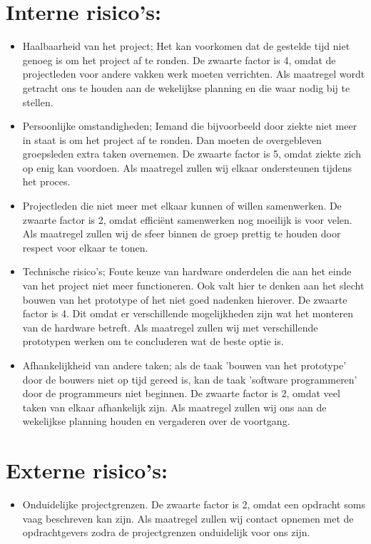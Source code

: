 \documentclass[oneside]{book}
\begin{document}
\section*{Interne risico's:}
{\color{red}
\begin{itemize}
	\item Haalbaarheid van het project; Het kan voorkomen dat de gestelde
   tijd niet genoeg is om het project af te ronden. De zwaarte factor is 4, omdat de 
   projectleden voor andere vakken werk moeten verrichten. Als maatregel wordt getracht ons  
   te houden aan de wekelijkse planning en die waar nodig bij te stellen.

	\item Persoonlijke omstandigheden; Iemand die bijvoorbeeld door ziekte niet meer in staat is om   
   het project af te ronden. Dan moeten de overgebleven groepsleden extra taken overnemen. 
   De zwaarte factor is 5,  omdat ziekte zich op enig kan voordoen. Als maatregel zullen wij 
   elkaar ondersteunen tijdens het proces. 

	\item Projectleden die niet meer met elkaar kunnen of willen samenwerken. De zwaarte factor is 2, 
   omdat efficiënt samenwerken nog moeilijk is voor velen. Als maatregel  
    zullen wij de sfeer binnen de groep prettig te houden door respect voor elkaar te tonen.

	\item Technische risico's; Foute keuze van hardware onderdelen die 
   aan het einde van het project niet meer functioneren. Ook valt hier te denken aan het slecht  
   bouwen van het prototype of het niet goed nadenken hierover. De zwaarte factor is 4. Dit 
   omdat er verschillende mogelijkheden zijn wat het monteren van de hardware 
   betreft. Als maatregel zullen wij met verschillende prototypen werken om te concluderen wat 
   de beste optie is.  

	\item Afhankelijkheid  van andere taken; als de taak 'bouwen van het prototype' door de
   bouwers niet op tijd gereed is, kan de taak 'software programmeren' door de programmeurs  
   niet beginnen. De zwaarte factor is 2, omdat veel taken van elkaar afhankelijk  
   zijn. Als maatregel zullen wij ons aan de wekelijkse planning houden en vergaderen over de 
   voortgang.
\end{itemize}
 
 \clearpage

\section*{Externe risico's:}
\begin{itemize}
	\item Onduidelijke projectgrenzen. De zwaarte factor is 2, omdat een opdracht soms vaag 
    beschreven kan zijn. Als maatregel zullen wij contact opnemen met de opdrachtgevers zodra 
    de projectgrenzen onduidelijk voor ons zijn.


\end{itemize}}
\end{document}
